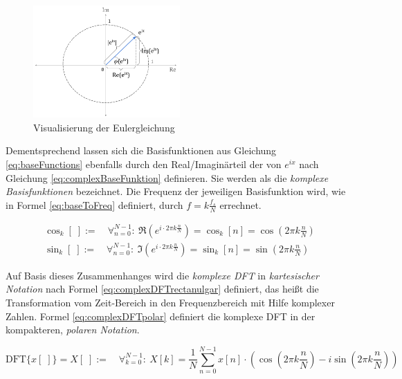 \begin{figure}[h]
	\centering
	\includegraphics[width=0.5\textwidth]{bilder/eulersRelation02.png}
	\caption{Visualisierung der Eulergleichung}
	\label{img:eulersRelation}
\end{figure}

Dementsprechend lassen sich die Basisfunktionen aus Gleichung \ref{eq:baseFunctions} ebenfalls durch den Real/Imaginärteil der von $e^{ix}$ nach Gleichung \ref{eq:complexBaseFunktion} definieren. Sie werden als die \emph{komplexe Basisfunktionen} bezeichnet. Die Frequenz der jeweiligen Basisfunktion wird, wie in Formel \ref{eq:baseToFreq} definiert, durch  $f = k\frac{f_s}{N}$ errechnet. 

\begin{equation}
\begin{gathered}
\cos_k[\;] := \quad \mathop{\forall}_{n = 0}^{N-1} :\  \Re(e^{i\cdot 2\pi k \frac{n}{N}}) = \cos_k[n] = \cos(2\pi k \frac{n}{N}) \\
\sin_k[\;] := \quad \mathop{\forall}_{n = 0}^{N-1} :\ \Im(e^{i\cdot 2\pi k \frac{n}{N}}) = \sin_k[n] = \sin(2\pi k \frac{n}{N})
\end{gathered}
\label{eq:complexBaseFunktion}
\end{equation}

Auf Basis dieses Zusammenhanges wird die \emph{komplexe DFT} in \emph{kartesischer Notation} nach Formel \ref{eq:complexDFTrectanulgar} definiert, das heißt die Transformation vom Zeit-Bereich in den Frequenzbereich mit Hilfe komplexer Zahlen. Formel \ref{eq:complexDFTpolar} definiert die komplexe DFT in der kompakteren, \emph{polaren Notation}. \cite[S. 570]{dspGuide}

\begin{equation}
\label{eq:complexDFTrectanulgar}
\text{DFT}\{x[\;]\} = X[\;]  := \quad \mathop{\forall}_{k = 0}^{N-1} :\ X[k] = \frac{1}{N} \sum_{n = 0}^{N-1}  x[n] \cdot (\cos (2\pi k \frac{n}{N}) -i \sin (2 \pi k \frac{n}{N}) )
\end{equation}

